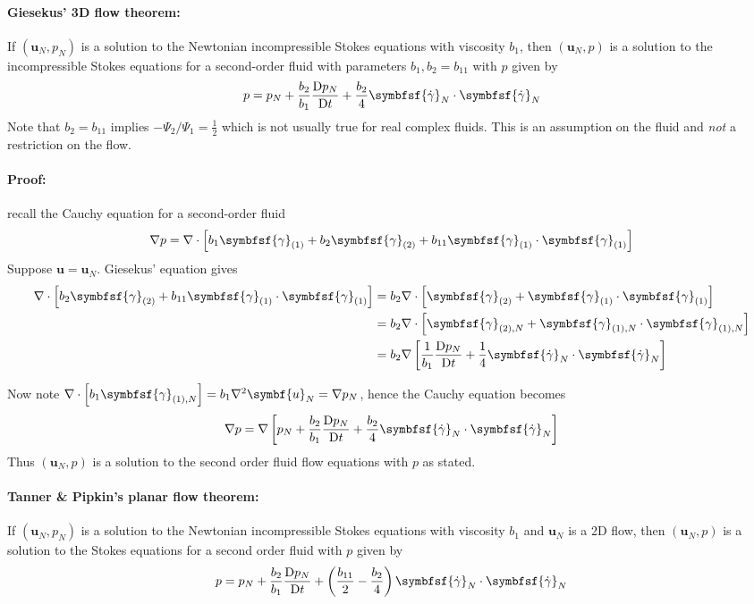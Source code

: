 \documentclass{jknotes}
\newcommand{\nsrate}[1]{\symbfsf{\gamma}_{(#1)}}
\newcommand{\Nsrate}[1]{\symbfsf{\gamma}_{(#1),N}}
\begin{document}
\paragraph{Giesekus' 3D flow theorem:}
If $(\symbf{u}_N, p_N)$ is a solution to the Newtonian incompressible Stokes
equations with viscosity $b_1$, then $(\symbf{u}_N, p)$ is a solution to the
incompressible Stokes equations for a second-order fluid with parameters $b_1,
b_2 = b_{11}$ with $p$ given by
\begin{equation}
	p = p_N + \frac{b_2}{b_1} \frac{\diffD p_N}{\diffD t} + \frac{b_2}{4}
	\symbfsf{\srate}_N \cdot \symbfsf{\srate}_N
\end{equation}
Note that $b_2 = b_{11}$ implies $-\Psi_2/\Psi_1 = \frac{1}{2}$ which is not
usually true for real complex fluids. This is an assumption on the fluid and
\emph{not} a restriction on the flow.

\paragraph{Proof:} recall the Cauchy equation for a second-order fluid
\begin{equation}
	\nabla p = \nabla \cdot \left[ b_1 \nsrate{1} + b_2 \nsrate{2} + b_{11}
	\nsrate{1}\cdot\nsrate{1}\right]
\end{equation}
Suppose $\symbf{u} = \symbf{u}_N$. Giesekus' equation gives
\begin{align}
	\nabla \cdot \left[b_2 \nsrate{2} + b_{11}
		\nsrate{1}\cdot\nsrate{1}\right] &= b_2 \nabla \cdot \left[ \nsrate{2}
	+ \nsrate{1} \cdot \nsrate{1}\right] \\
	&= b_2 \nabla \cdot \left[ \Nsrate{2} + \Nsrate{1}\cdot\Nsrate{1}\right]
	\\
	&= b_2 \nabla \left[ \inv{b_1} \frac{\diffD p_N}{\diffD t} + \frac{1}{4}
\symbfsf{\srate}_N \cdot \symbfsf{\srate}_N \right]
\end{align}

Now note $\nabla \cdot\left[ b_1 \Nsrate{1}\right] = b_1 \nabla^2 \symbf{u}_N
= \nabla p_N$, hence the Cauchy equation becomes
\begin{equation}
	\nabla p = \nabla \left[ p_N + \frac{b_2}{b_1} \frac{\diffD p_N}{\diffD t}
	+ \frac{b_2}{4} \symbfsf{\srate}_N \cdot \symbfsf{\srate}_N \right]
\end{equation}
Thus $(\symbf{u}_N, p)$ is a solution to the second order fluid flow equations
with $p$ as stated. \qedsymbol

\paragraph{Tanner \& Pipkin's planar flow theorem:} If $(\symbf{u}_N, p_N)$ is
a solution to the Newtonian incompressible Stokes equations with viscosity
$b_1$ and $\symbf{u}_N$ is a 2D flow, then $(\symbf{u}_N, p)$ is a solution to the Stokes
equations for a second order fluid with $p$ given by
\begin{equation}
	p = p_N + \frac{b_2}{b_1} \frac{\diffD p_N}{\diffD t} +
	\left(\frac{b_{11}}{2} - \frac{b_2}{4}\right) \symbfsf{\srate}_N \cdot
	\symbfsf{\srate}_N
\end{equation}
\end{document}
